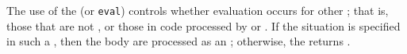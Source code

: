 The use of the   (or {\tt eval}) controls whether
evaluation occurs for other  ; that is, 
those that are not , or those in code processed by
 or .  If the  situation is
specified in such a , then the body  are processed as 
an ; otherwise, the  
returns \nil.
 


% 
% 
%   
